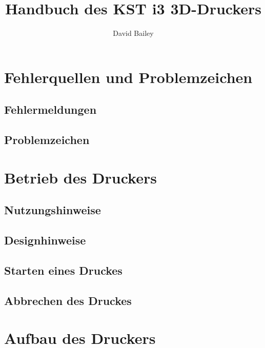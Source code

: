 \documentclass[11pt,a4paper]{article}
\title{Handbuch des KST i3 3D-Druckers}
\author{David Bailey}
\begin{document}
\maketitle
\newpage

\tableofcontents
\newpage

\section{Fehlerquellen und Problemzeichen}
\subsection{Fehlermeldungen}

\subsection{Problemzeichen}


\section{Betrieb des Druckers}
\subsection{Nutzungshinweise}
\subsection{Designhinweise}
\subsection{Starten eines Druckes}
\subsection{Abbrechen des Druckes}

\section{Aufbau des Druckers}
\end{document}
